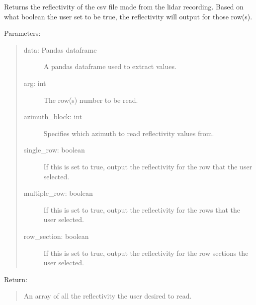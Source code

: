 \documentclass[letterpaper,10pt,english]{sphinxmanual}
\begin{document}
\begin{fulllineitems}
\label{\detokenize{Lidar extraction tool:lidar_extract.get_reflectivity}}
Returns the reflectivity of the csv file made from the lidar recording. Based on what boolean the user set to be true,
the reflectivity will output for those row(s).

Parameters:
\begin{quote}
\begin{description}
\item[{data: Pandas dataframe}] \leavevmode
A pandas dataframe used to extract values.

\item[{arg: int}] \leavevmode
The row(s) number to be read.

\item[{azimuth\_block: int}] \leavevmode
Specifies which azimuth to read reflectivity values from.

\item[{single\_row: boolean}] \leavevmode
If this is set to true, output the reflectivity for the row that the user selected.

\item[{multiple\_row: boolean}] \leavevmode
If this is set to true, output the reflectivity for the rows that the user selected.

\item[{row\_section: boolean}] \leavevmode
If this is set to true, output the reflectivity for the row sections the user selected.

\end{description}
\end{quote}

Return:
\begin{quote}

An array of all the reflectivity the user desired to read.
\end{quote}

\end{fulllineitems}

\end{document}
